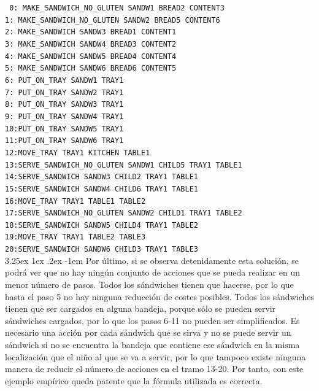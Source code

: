 \documentclass{article}
\makeatletter
\newcommand{\cool}[1] {
        {\texttt{#1}}
    }
\renewcommand\paragraph{\@startsection{paragraph}{5}{\z@}%
      {3.25ex \@plus1ex \@minus.2ex}%
      {-1em}%
      {\normalfont\normalsize\bfseries}}
\makeatother
\begin{document}
    \noindent{}\cool{
    0: MAKE\_SANDWICH\_NO\_GLUTEN  SANDW1 BREAD2  CONTENT3 \\
    1: MAKE\_SANDWICH\_NO\_GLUTEN  SANDW2 BREAD5  CONTENT6 \\
    2: MAKE\_SANDWICH              SANDW3 BREAD1  CONTENT1 \\
    3: MAKE\_SANDWICH              SANDW4 BREAD3  CONTENT2 \\
    4: MAKE\_SANDWICH              SANDW5 BREAD4  CONTENT4 \\
    5: MAKE\_SANDWICH              SANDW6 BREAD6  CONTENT5 \\
    6: PUT\_ON\_TRAY               SANDW1 TRAY1 \\
    7: PUT\_ON\_TRAY               SANDW2 TRAY1 \\
    8: PUT\_ON\_TRAY               SANDW3 TRAY1 \\
    9: PUT\_ON\_TRAY               SANDW4 TRAY1 \\
    10:PUT\_ON\_TRAY               SANDW5 TRAY1 \\
    11:PUT\_ON\_TRAY               SANDW6 TRAY1 \\
    12:MOVE\_TRAY                  TRAY1  KITCHEN TABLE1 \\
    13:SERVE\_SANDWICH\_NO\_GLUTEN SANDW1 CHILD5  TRAY1  TABLE1 \\
    14:SERVE\_SANDWICH             SANDW3 CHILD2  TRAY1  TABLE1 \\
    15:SERVE\_SANDWICH             SANDW4 CHILD6  TRAY1  TABLE1 \\
    16:MOVE\_TRAY                  TRAY1  TABLE1  TABLE2 \\
    17:SERVE\_SANDWICH\_NO\_GLUTEN SANDW2 CHILD1  TRAY1  TABLE2 \\
    18:SERVE\_SANDWICH             SANDW5 CHILD4  TRAY1  TABLE2 \\
    19:MOVE\_TRAY                  TRAY1  TABLE2  TABLE3 \\
    20:SERVE\_SANDWICH             SANDW6 CHILD3  TRAY1  TABLE3} \\
    
    \paragraph{}
    Por último, si se observa detenidamente esta solución, se podrá ver que no hay ningún conjunto de acciones que se pueda realizar en un menor número de pasos. Todos los sándwiches tienen que hacerse, por lo que hasta el paso 5 no hay ninguna reducción de costes posibles. Todos los sándwiches tienen que ser cargados en alguna bandeja, porque sólo se pueden servir sándwiches cargados, por lo que los pasos 6-11 no pueden ser simplificados. Es necesario una acción por cada sándwich que se sirva y no se puede servir un sándwich si no se encuentra la bandeja que contiene ese sándwich en la misma localización que el niño al que se va a servir, por lo que tampoco existe ninguna manera de reducir el número de acciones en el tramo 13-20. Por tanto, con este ejemplo empírico queda patente que la fórmula utilizada es correcta.
    
\end{document}
